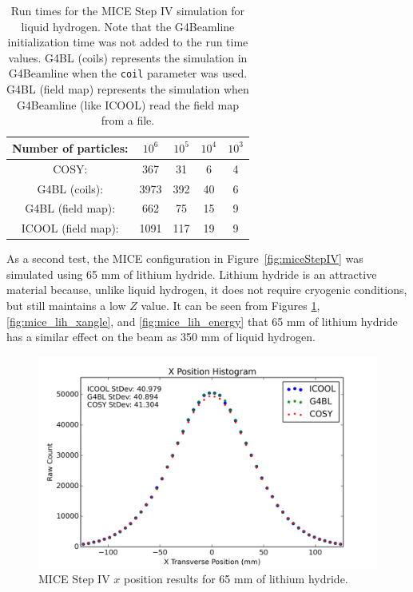 \begin{table}
\caption[Run times for the MICE Step IV simulation.]{Run times for the MICE Step IV simulation for liquid hydrogen. Note that the G4Beamline initialization time was not added to the run time values. G4BL (coils) represents the simulation in G4Beamline when the \texttt{coil} parameter was used. G4BL (field map) represents the simulation when G4Beamline (like ICOOL) read the field map from a file.}
\begin{center}
\begin{tabularx}{0.55\textwidth}{ccccc}
\hline \hline
Number of particles: & $10^6$ & $10^5$ & $10^4$ & $10^3$\\
\hline
COSY: & 367 & 31 & 6 & 4\vspace{-12pt}\\
G4BL (coils): & 3973 & 392 & 40 & 6\vspace{-12pt}\\
G4BL (field map): & 662 & 75 & 15 & 9\vspace{-12pt}\\
ICOOL (field map): & 1091 & 117 & 19 & 9\\
\hline
\end{tabularx}
\end{center}
\label{tbl:mice_times}
\end{table}

As a second test, the MICE configuration in Figure~\ref{fig:miceStepIV} was simulated using 65 mm of lithium hydride. Lithium hydride is an attractive material because, unlike liquid hydrogen, it does not require cryogenic conditions, but still maintains a low $Z$ value. It can be seen from Figures \ref{fig:mice_lih_x}, \ref{fig:mice_lih_xangle}, and \ref{fig:mice_lih_energy} that 65 mm of lithium hydride has a similar effect on the beam as 350 mm of liquid hydrogen.

\begin{figure}[H]
  \centering
    \includegraphics[width=\textwidth]{MICE data/LiH/x} 
  \caption{MICE Step IV $x$ position results for 65 mm of lithium hydride.}
  \label{fig:mice_lih_x}
\end{figure}

